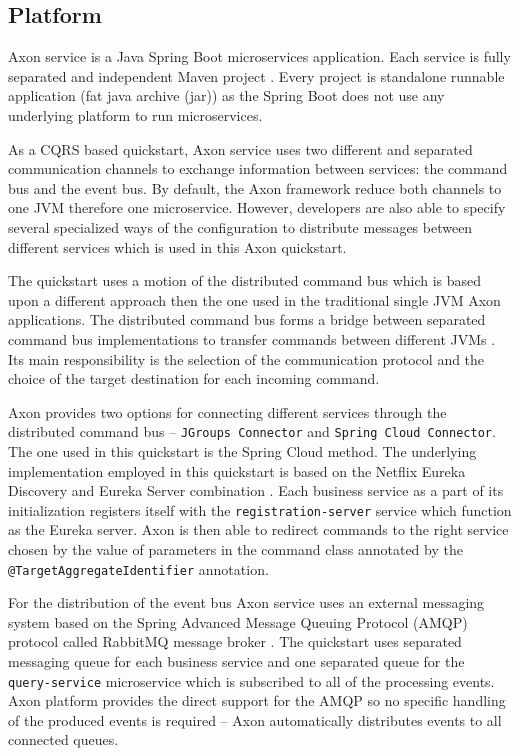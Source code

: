 \documentclass[oneside,
  digital, %
  table,   %
  nolof,     %
  nolot,     %
]{fithesis3}
\begin{document}
\subsection{Platform}

Axon service is a Java Spring Boot \cite{spring_boot} microservices application. Each service is fully separated and independent Maven  project \cite{maven}. Every project is standalone runnable application (fat java archive (jar)) as the Spring Boot does not use any underlying platform to run microservices.

As a CQRS based quickstart, Axon service uses two different and separated communication channels to exchange information between services: the command bus and the event bus. By default, the Axon framework reduce both channels to one JVM therefore one microservice. However, developers are also able to specify several specialized ways of the configuration to distribute messages between different services which is used in this Axon quickstart.

The quickstart uses a motion of the distributed command bus which is based upon a different approach then the one used in the traditional single JVM Axon applications. The distributed command bus forms a bridge between separated command bus implementations to transfer commands between different JVMs \cite{axon_framework_reference_guide}. Its main responsibility is the selection of the communication protocol and the choice of the target destination for each incoming command. 

Axon provides two options for connecting different services through the distributed command bus -- \texttt{JGroups Connector} and \texttt{Spring Cloud Connector}. The one used in this quickstart is the Spring Cloud method. The underlying implementation employed in this quickstart is based on the Netflix Eureka Discovery and Eureka Server combination \cite{service_registration}. Each business service as a part of its initialization registers itself with the  \texttt{registration-server} service which function as the Eureka server. Axon is then able to redirect commands to the right service chosen by the value of parameters in the command class annotated by the \texttt{@TargetAggregateIdentifier} annotation.

For the distribution of the event bus Axon service uses an external messaging system based on the Spring Advanced Message Queuing Protocol (AMQP) protocol called RabbitMQ message broker \cite{rabbitmq}. The quickstart uses separated messaging queue for each business service and one separated queue for the \texttt{query-service} microservice which is subscribed to all of the processing events. Axon platform provides the direct support for the AMQP so no specific handling of the produced events is required -- Axon automatically distributes events to all connected queues.
\end{document}
